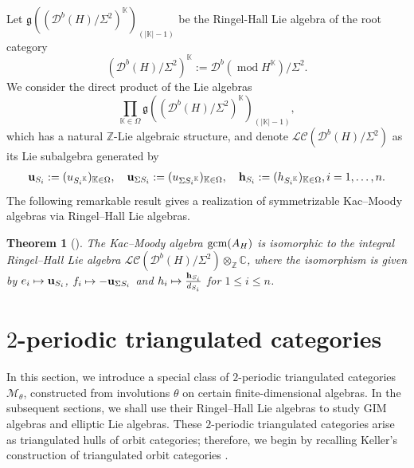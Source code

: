 \documentclass[12pt,reqno]{amsart}
\numberwithin{equation}{section}
\renewcommand{\mod}{\operatorname{mod}\nolimits}
\newtheorem{theorem}{Theorem}[section]
\begin{document}
	Let $\mathfrak{g}((\mathcal{D}^b(H)/\Sigma^2)^\mathbb{K})_{(|\mathbb{K}|-1)}$ be the Ringel-Hall Lie algebra of the root category \[(\mathcal{D}^b(H)/\Sigma^2)^\mathbb{K}:=\mathcal{D}^b(\mod H^\mathbb{K})/\Sigma^2.\] We consider the direct product of the Lie algebras \[\prod_{\mathbb{K}\in \Omega} \mathfrak{g}((\mathcal{D}^b(H)/\Sigma^2)^\mathbb{K})_{(|\mathbb{K}|-1)},\] which has a natural $\mathbb{Z}$-Lie algebraic structure, and denote $\mathscr{LC}(\mathcal{D}^b(H)/\Sigma^2)$ as its Lie subalgebra generated by 
	\begin{align}
		{\bf u}_{S_i}:=(u_{{S_i}^\mathbb{K}})_{\mathbb{K}\in\Omega},\quad
		{\bf u}_{\Sigma S_{i}}:=
		(u_{\Sigma {S_i}^\mathbb{K}})_{\mathbb{K}\in\Omega},\quad
		{\bf h}_{S_i}:=(h_{{S_i}^\mathbb{K}})_{\mathbb{K}\in\Omega}
		,i=1,\dots,n.  
	\end{align}
	The following remarkable result gives a realization of symmetrizable Kac--Moody algebras via Ringel--Hall Lie algebras.
	\begin{theorem}[{\cite[Theorem 4.7]{PX00-Tri-Cat-Kac}}]\label{thm:PX-realization}
		The Kac--Moody algebra ${\rm gcm}(A_H)$ is isomorphic to the integral Ringel--Hall Lie algebra $\mathscr{LC}(\mathcal{D}^b(H)/\Sigma^2)\otimes_{\mathbb{Z}}\mathbb{C}$, where the isomorphism is given by $e_i\mapsto {\bf u}_{S_i}$, $f_i\mapsto -{\bf u}_{\Sigma S_i}$ and $h_i\mapsto \frac{{\bf h}_{S_i}}{d_{S_i}}$ for $1\leq i\leq n$.
	\end{theorem}
	
	
	
	
	\section{$2$-periodic triangulated categories}\label{s:2-periodic-M} 
	In this section, we introduce a special class of $2$-periodic triangulated categories $\mathcal{M}_\theta$, constructed from involutions $\theta$ on certain finite-dimensional algebras. In the subsequent sections, we shall use their Ringel--Hall Lie
	algebras to study GIM algebras and elliptic Lie algebras. These $2$-periodic triangulated categories arise as triangulated hulls of orbit categories; therefore, we
	begin by recalling Keller's construction of triangulated orbit categories
	\cite{Ke05-tri-orb-cat}.
	
	
	
\end{document}
